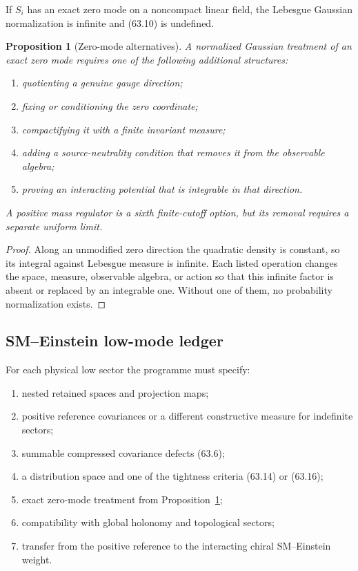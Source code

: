 \documentclass[11pt]{article}
\newtheorem{proposition}[theorem]{Proposition}
\begin{document}
If \(S_i\) has an exact zero mode on a noncompact linear field, the
Lebesgue Gaussian normalization is infinite and (63.10) is undefined.

\begin{proposition}[Zero-mode alternatives]
\label{prop:v11v63-zero}
A normalized Gaussian treatment of an exact zero mode requires one of
the following additional structures:
\begin{enumerate}
\item quotienting a genuine gauge direction;
\item fixing or conditioning the zero coordinate;
\item compactifying it with a finite invariant measure;
\item adding a source-neutrality condition that removes it from the
observable algebra;
\item proving an interacting potential that is integrable in that
direction.
\end{enumerate}
A positive mass regulator is a sixth finite-cutoff option, but its
removal requires a separate uniform limit.
\end{proposition}

\begin{proof}
Along an unmodified zero direction the quadratic density is constant,
so its integral against Lebesgue measure is infinite.  Each listed
operation changes the space, measure, observable algebra, or action so
that this infinite factor is absent or replaced by an integrable one.
Without one of them, no probability normalization exists.
\end{proof}

\subsection{SM--Einstein low-mode ledger}

\begin{ledger}
\label{led:v11v63-data}
For each physical low sector the programme must specify:
\begin{enumerate}
\item nested retained spaces and projection maps;
\item positive reference covariances or a different constructive
measure for indefinite sectors;
\item summable compressed covariance defects (63.6);
\item a distribution space and one of the tightness criteria
(63.14) or (63.16);
\item exact zero-mode treatment from
Proposition~\ref{prop:v11v63-zero};
\item compatibility with global holonomy and topological sectors;
\item transfer from the positive reference to the interacting chiral
SM--Einstein weight.
\end{enumerate}
\end{ledger}
\end{document}

